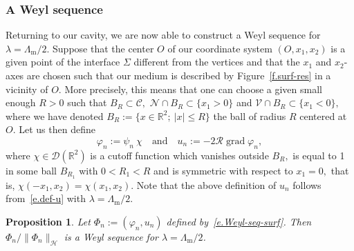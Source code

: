 \documentclass[10pt]{amsart}
\newtheorem{prop}[cdrthm]{Proposition}
\theoremstyle{definition}
\DeclareMathOperator{\grad}{grad}
\newcommand{\calC}{\mathcal{C}}
\newcommand{\calD}{\mathcal{D}}
\newcommand{\calH}{\mathcal{H}}
\newcommand{\calN}{\mathcal{N}}
\newcommand{\calR}{\mathcal{R}}
\newcommand{\calV}{\mathcal{V}}
\newcommand{\bbR}{\mathbb{R}}
\newcommand{\Lm}{{\Lambda_{\mathrm{m}}}}
\begin{document}
\subsubsection{A Weyl sequence}
Returning to our cavity, we are now able to construct a Weyl sequence for\linebreak$\lambda = \Lm/2$. Suppose that the center $O$ of our coordinate system $(O,x_1,x_2)$ is a given point of the interface $\Sigma$ different from the vertices and that the $x_1$ and $x_2$-axes are chosen such that our medium is described by Figure~\ref{f.surf-res} in a vicinity of $O.$ More precisely, this means that one can choose a given small enough $R>0$ such that $B_R \subset \calC,$ $\calN \cap B_R \subset \{x_1 > 0\}$ and $\calV \cap B_R \subset \{x_1 < 0\},$ where we have denoted $B_R := \{ x \in \bbR^2;\ |x| \le R \}$ the ball of radius $R$ centered at $O.$ Let us then define
\begin{equation}\label{e.Weyl-seq-surf}
\varphi_n := \psi_n \ \chi
\quad\text{and}\quad u_n := -2 \calR \grad \varphi_n,
\end{equation}
where $\chi \in \calD(\bbR^2)$ is a cutoff function which vanishes outside $B_R,$ is equal to 1 in some ball $B_{R_1}$ with $0 < R_1 < R$ and is symmetric with respect to $x_1=0,$ that is, $\chi(-x_1,x_2) = \chi(x_1,x_2).$ Note that the above definition of $u_n$ follows from~\eqref{e.def-u} with $\lambda=\Lm/2$.

\begin{prop}\label{p-Weyl-surface}
Let $\Phi_n := (\varphi_n,u_n)$ defined by~\eqref{e.Weyl-seq-surf}. Then $\Phi_n/\|\Phi_n\|_\calH$ is a Weyl sequence for $\lambda = \Lm/2$.
\end{prop}
\end{document}
